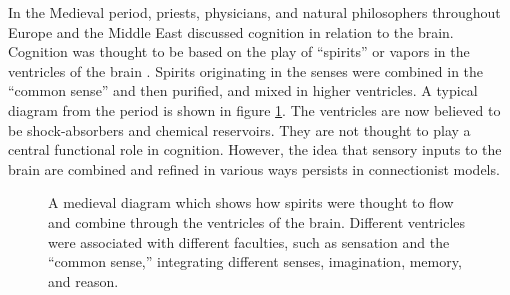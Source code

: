 In the Medieval period, priests, physicians, and natural philosophers throughout Europe and the Middle East discussed cognition in relation to the brain. Cognition was thought to be based on the play of ``spirits'' or vapors in the ventricles of the brain \cite{finger2001origins}. Spirits originating in the senses were combined in the ``common sense'' and then purified, and mixed in higher ventricles. A typical diagram from the period is shown in figure \ref{medieval}. The ventricles are now believed to be shock-absorbers and chemical reservoirs. They are not thought to play a central functional role in cognition. However, the idea that sensory inputs to the brain are combined and refined in various ways persists in connectionist models.


\begin{figure}[h]
\centering
{}
\caption[From Gr\"{u}sser, 1990 \cite{grusser1990seat}]{A medieval diagram which shows how spirits were thought to flow and combine through the ventricles of the brain. Different ventricles were associated with different faculties, such as sensation and the ``common sense,'' integrating different senses, imagination, memory, and reason.}
\label{medieval}
\end{figure}

